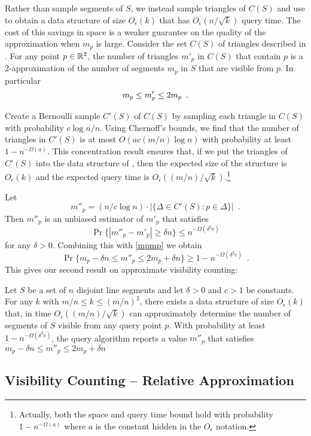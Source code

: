 \documentclass{patmorin}
\newcommand{\Oe}{O_\epsilon}
\begin{document}
Rather than sample segments of $S$, we instead sample triangles of $C(S)$
and use  to obtain a data structure of size $\Oe(k)$
that has $\Oe(n/\sqrt{k})$ query time.  The cost of this savings
in space is a weaker guarantee on the quality of the approximation
when $m_p$ is large.  Consider the set $C(S)$ of triangles described
in .  For any point $p\in\mathbb{R}^2$, the number of triangles
$m'_p$ in $C(S)$ that contain $p$ is a 2-approximation of the number of
segments $m_p$ in $S$ that are visible from $p$.  In particular
\begin{equation}
   m_p \le m'_p \le 2m_p \enspace . \eqlabel{mpmp}
\end{equation}

Create a Bernoulli sample $C'(S)$ of $C(S)$ by sampling each triangle
in $C(S)$ with probability $c\log n / n$.  Using Chernoff's bounds, we
find that the number of triangles in $C'(S)$ is at most $O(ac(m/n)\log
n)$ with probability at least $1-n^{-\Omega(a)}$.  This concentration
result ensures that, if we put the triangles of $C'(S)$ into the
data structure of , then the expected
size of the structure is $\Oe(k)$ and the expected query time is
$\Oe((m/n)/\sqrt{k})$.\footnote{Actually, both the space and query time
bound hold with probability $1-n^{-\Omega(a)}$ where $a$ is the constant
hidden in the $\Oe$ notation.}

Let
\[
   m''_p= (n/c\log n)\cdot|\{\Delta\in C'(S): p\in \Delta\}| \enspace .
\]
Then $m''_p$ is an unbiased estimator of $m'_p$ that satisfies
\[
   \Pr\{|m''_p - m'_p| \ge \delta n\} \le n^{-\Omega(\delta^2 c)}
\]
for any $\delta > 0$.
Combining this with \eqref{mpmp} we obtain
\[
   \Pr\{m_p-\delta n \le m''_p \le 2m_p+\delta n\} 
     \ge 1-n^{-\Omega(\delta^2 c)}  \enspace .
\]
This gives our second result on approximate visibility counting:

\begin{thm}
Let $S$ be a set of $n$ disjoint line segments and let $\delta > 0$ and $c
>1$ be constants.  For any $k$ with $m/n
\le k \le (m/n)^2$, there exists a data structure of size $\Oe(k)$ that,
in time $\Oe((m/n)/\sqrt{k})$ can approximately determine the number of
segments of $S$ visible from any query point $p$.  With probability at
least $1-n^{-\Omega(\delta^2 c)}$, the query algorithm
reports a value $m''_p$ that satisfies $m_p-\delta n \le m''_p \le
2m_p+\delta n$
\end{thm}

\subsection{Visibility Counting -- Relative Approximation}
\end{document}
